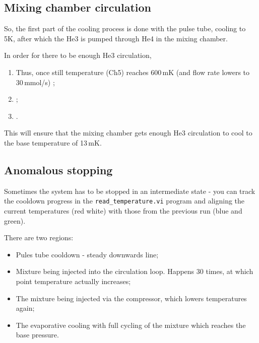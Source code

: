 \subsection{Mixing chamber circulation}
\label{sec:mixing-chamb-circ}

So, the first part of the cooling process is done with the pulse tube, cooling
to 5K, after which the He3 is pumped through He4 in the mixing chamber.

In order for there to be enough He3 circulation, 

\begin{enumerate}
  \item Thus, once still temperature (Ch5) reaches 600\,mK (and flow rate lowers
        to 30\,mmol/s) \ira {};
  \item {};
  \item {}.
\end{enumerate}

\noindent This will ensure that the mixing chamber gets enough He3 circulation
to cool to the base temperature of 13\,mK.

\subsection{Anomalous stopping}
\label{sec:anomalous-stopping}

Sometimes the system has to be stopped in an intermediate state - you can track
the cooldown progress in the \verb|read_temperature.vi| program and aligning the
current temperatures (red white) with those from the previous run (blue and
green).

There are two regions:
\begin{itemize}
  \item Pules tube cooldown - steady downwards line;
  \item Mixture being injected into the circulation loop. Happens 30 times, at
        which point temperature actually increases;
  \item The mixture being injected via the compressor, which lowers temperatures
        again;
  \item The evaporative cooling with full cycling of the mixture which reaches
        the base pressure.
\end{itemize}

